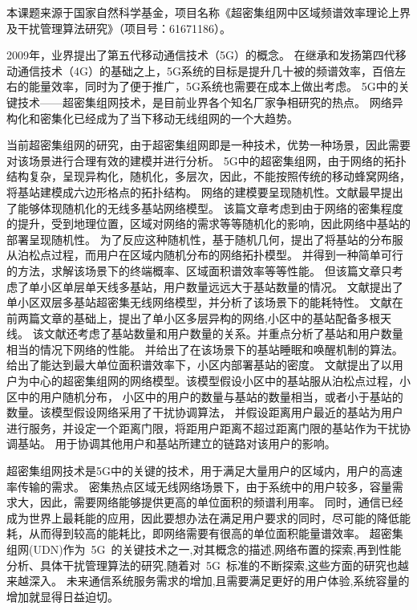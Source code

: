 本课题来源于国家自然科学基金，项目名称《超密集组网中区域频谱效率理论上界及干扰管理算法研究》（项目号：61671186）。


2009年，业界提出了第五代移动通信技术（5G）的概念。
在继承和发扬第四代移动通信技术（4G）的基础之上，5G系统的目标是提升几十被的频谱效率，百倍左右的能量效率，同时为了便于推广，5G系统也需要在成本上做出考虑。
5G中的关键技术——超密集组网技术，是目前业界各个知名厂家争相研究的热点\cite{zhanghong}。
网络异构化和密集化已经成为了当下移动无线组网的一个大趋势。

当前超密集组网的研究，由于超密集组网即是一种技术，优势一种场景，因此需要对该场景进行合理有效的建模并进行分析。
5G中的超密集组网，由于网络的拓扑结构复杂，呈现异构化，随机化，多层次，因此，不能按照传统的移动蜂窝网络，将基站建模成六边形格点的拓扑结构。
网络的建模要呈现随机性。文献\cite{ATractable}最早提出了能够体现随机化的无线多基站网络模型。
该篇文章考虑到由于网络的密集程度的提升，受到地理位置，区域对网络的需求等等随机化的影响，因此网络中基站的部署呈现随机性。
为了反应这种随机性，基于随机几何，提出了将基站的分布服从泊松点过程，而用户在区域内随机分布的网络拓扑模型。
并得到一种简单可行的方法，求解该场景下的终端概率、区域面积谱效率等等性能。
但该篇文章只考虑了单小区单层单天线多基站，用户数量远远大于基站数量的情况。
文献\cite{2LayerPC}提出了单小区双层多基站超密集无线网络模型，并分析了该场景下的能耗特性。
文献\cite{UDNMIMO}在前两篇文章的基础上，提出了单小区多层异构的网络,小区中的基站配备多根天线。
该文献还考虑了基站数量和用户数量的关系。并重点分析了基站和用户数量相当的情况下网络的性能。
并给出了在该场景下的基站睡眠和唤醒机制的算法。给出了能达到最大单位面积谱效率下，小区内部署基站的密度。
文献\cite{user-centric}提出了以用户为中心的超密集组网的网络模型。该模型假设小区中的基站服从泊松点过程，小区中的用户随机分布，
小区中的用户的数量与基站的数量相当，或者小于基站的数量。该模型假设网络采用了干扰协调算法，
并假设距离用户最近的基站为用户进行服务，并设定一个距离门限，将距用户距离不超过距离门限的基站作为干扰协调基站。
用于协调其他用户和基站所建立的链路对该用户的影响。

超密集组网技术是5G中的关键的技术，用于满足大量用户的区域内，用户的高速率传输的需求。
密集热点区域无线网络场景下，由于系统中的用户较多，容量需求大，因此，需要网络能够提供更高的单位面积的频谱利用率。
同时，通信已经成为世界上最耗能的应用，因此要想办法在满足用户要求的同时，尽可能的降低能耗，从而得到较高的能耗比，即网络需要有很高的单位面积能量谱效率。
超密集组网(UDN)作为~5G~的关键技术之一,对其概念的描述,网络布置的探索,再到性能分析、具体干扰管理算法的研究,随着对~5G~标准的不断探索,这些方面的研究也越来越深入。
未来通信系统服务需求的增加,且需要满足更好的用户体验,系统容量的增加就显得日益迫切。


